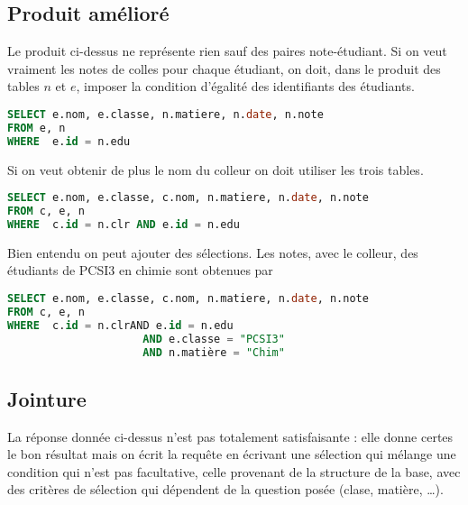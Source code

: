 \subsection{Produit amélioré}
Le produit ci-dessus ne représente rien sauf des paires note-étudiant. Si on veut vraiment les notes de colles pour chaque étudiant, on doit, dans le produit des tables $n$ et $e$, imposer la condition d'égalité des identifiants des étudiants. 
\begin{lstlisting}[language=SQL]
SELECT e.nom, e.classe, n.matiere, n.date, n.note
FROM e, n
WHERE  e.id = n.edu
\end{lstlisting}
Si on veut obtenir de plus le nom du colleur on doit utiliser les trois tables.
\begin{lstlisting}[language=SQL]
SELECT e.nom, e.classe, c.nom, n.matiere, n.date, n.note
FROM c, e, n
WHERE  c.id = n.clr AND e.id = n.edu
\end{lstlisting}
Bien entendu on peut ajouter des sélections. Les notes, avec le colleur, des étudiants de PCSI3 en chimie sont obtenues par 
\begin{lstlisting}[language=SQL]
SELECT e.nom, e.classe, c.nom, n.matiere, n.date, n.note
FROM c, e, n
WHERE  c.id = n.clrAND e.id = n.edu
                     AND e.classe = "PCSI3"
                     AND n.matière = "Chim"
\end{lstlisting}

\subsection{Jointure}
La réponse donnée ci-dessus n'est pas totalement satisfaisante : elle donne certes le bon résultat mais on écrit la requête en écrivant une sélection qui mélange une condition qui n'est pas facultative, celle provenant de la structure de la base, avec des critères de sélection qui dépendent de la question posée (clase, matière, \dots). 


